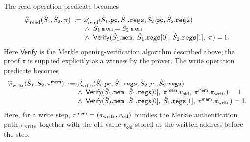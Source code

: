 The read operation predicate becomes
\begin{equation}\label{eq:op-mem-comm-read}
\begin{array}{r@{\;}l}
  \widehat{\pred{}}_{\rea}(\hat{S}_1,\hat{S}_2,\pi) \;:= &
    \varphi'_{\rea}(\hat{S}_1.\pc,\hat{S}_1.\regs,\hat{S}_2.\pc,\hat{S}_2.\regs)\\
  & {}\wedge\; \hat{S}_1.\mem = \hat{S}_2.\mem\\
  & {}\wedge\;
    \mathsf{Verify}(\hat{S}_1.\mem,\;\hat{S}_1.\regs[0],\;\hat{S}_2.\regs[1],\;\pi)=1.
\end{array}
\end{equation}
Here $\mathsf{Verify}$ is the Merkle opening-verification algorithm described above;
the proof $\pi$ is supplied explicitly as a witness by the prover.
The write operation predicate becomes
\begin{equation}\label{eq:op-mem-comm-write}
\begin{array}{r@{\;}l}
  \widehat{\pred{}}_{\writ}(\hat{S}_1,\hat{S}_2,\pi^{\mathsf{mem}}) \;:= &
    \varphi'_{\writ}(\hat{S}_1.\pc,\hat{S}_1.\regs,\hat{S}_2.\pc,\hat{S}_2.\regs)\\
  & {}\wedge\; \mathsf{Verify}(\hat{S}_1.\mem,\;\hat{S}_1.\regs[0],\;\pi^{\mathsf{mem}}.v_{\mathsf{old}},\;\pi^{\mathsf{mem}}.\pi_{\writ})=1\\
  & {}\wedge\; \mathsf{Verify}(\hat{S}_2.\mem,\;\hat{S}_1.\regs[0],\;\hat{S}_1.\regs[1],\;\pi^{\mathsf{mem}}.\pi_{\writ})=1.
\end{array}
\end{equation}
Here, for a write step, $\pi^{\mathsf{mem}} = (\pi_{\mathrm{write}}, v_{\mathsf{old}})$ bundles the
Merkle authentication path $\pi_{\mathrm{write}}$ together with the old value $v_{\mathsf{old}}$
stored at the written address before the step.



